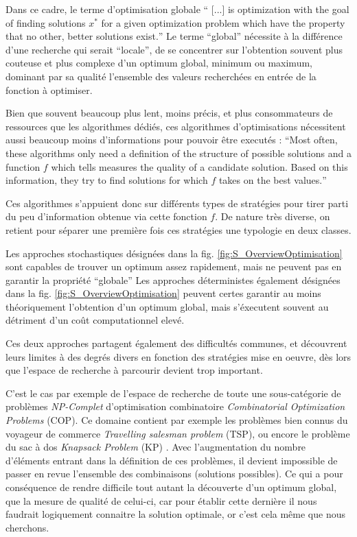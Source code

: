 Dans ce cadre, le terme d'optimisation globale \foreignquote{english}{ [...] is optimization with the goal of finding solutions $x^*$ for a given optimization problem which have the property that no other, better solutions exist.} Le terme \enquote{global} nécessite à la différence d'une recherche qui serait \enquote{locale}, de se concentrer sur l'obtention souvent plus couteuse et plus complexe d'un optimum global, minimum ou maximum, dominant par sa qualité l'ensemble des valeurs recherchées en entrée de la fonction à optimiser.

Bien que souvent beaucoup plus lent, moins précis, et plus consommateurs de ressources que les algorithmes dédiés, ces algorithmes d'optimisations nécessitent aussi beaucoup moins d'informations pour pouvoir être executés : \foreignquote{english}{Most often, these algorithms only need a definition of the structure of possible solutions and a function $f$ which tells measures the quality of a candidate solution. Based on this information, they try to find solutions for which $f$ takes on the best values.} \autocite[24]{Weise2011}

Ces algorithmes s'appuient donc sur différents types de stratégies pour tirer parti du peu d'information obtenue via cette fonction $f$. De nature très diverse, on retient pour séparer une première fois ces stratégies une typologie en deux classes. 

\begin{itemize}[label=\textbullet]
 Les approches stochastiques désignées dans la fig. \ref{fig:S_OverviewOptimisation} sont capables de trouver un optimum assez rapidement, mais ne peuvent pas en garantir la propriété \enquote{globale}
 Les approches déterministes également désignées dans la fig. \ref{fig:S_OverviewOptimisation} peuvent certes garantir au moins théoriquement l'obtention d'un optimum global, mais s'éxecutent souvent au détriment d'un coût computationnel elevé.
\end{itemize}

Ces deux approches partagent également des difficultés communes, et découvrent leurs limites à des degrés divers en fonction des stratégies mise en oeuvre, dès lors que l'espace de recherche à parcourir devient trop important.

C'est le cas par exemple de l'espace de recherche de toute une sous-catégorie de problèmes \textit{NP-Complet}  d'optimisation combinatoire \textit{Combinatorial Optimization Problems} (COP). Ce domaine contient par exemple les problèmes bien connus du voyageur de commerce \textit{Travelling salesman problem} (TSP), ou encore le problème du sac à dos \textit{Knapsack Problem} (KP) . Avec l'augmentation du nombre d'éléments entrant dans la définition de ces problèmes, il devient impossible de passer en revue l'ensemble des combinaisons (solutions possibles). Ce qui a pour conséquence de rendre difficile tout autant la découverte d'un optimum global, que la mesure de qualité de celui-ci, car pour établir cette dernière il nous faudrait logiquement connaitre la solution optimale, or c'est cela même que nous cherchons. 

